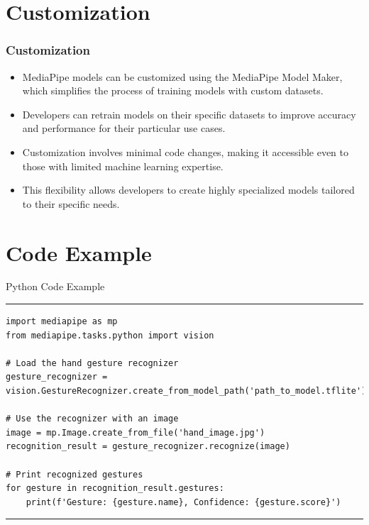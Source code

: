 \documentclass[aspectratio=169, hideothersubsections]{beamer}
\begin{document}
\section{Customization}
\begin{frame}
    \frametitle{Customization}
    \begin{itemize}
        \item MediaPipe models can be customized using the MediaPipe Model Maker, which simplifies the process of training models with custom datasets.
        \item Developers can retrain models on their specific datasets to improve accuracy and performance for their particular use cases.
        \item Customization involves minimal code changes, making it accessible even to those with limited machine learning expertise.
        \item This flexibility allows developers to create highly specialized models tailored to their specific needs.
    \end{itemize}
\end{frame}

\section{Code Example}
\begin{frame}[fragile]{Python Code Example}
\rule{\textwidth}{1pt}
\scriptsize
\begin{verbatim}
import mediapipe as mp
from mediapipe.tasks.python import vision

# Load the hand gesture recognizer
gesture_recognizer = vision.GestureRecognizer.create_from_model_path('path_to_model.tflite')

# Use the recognizer with an image
image = mp.Image.create_from_file('hand_image.jpg')
recognition_result = gesture_recognizer.recognize(image)

# Print recognized gestures
for gesture in recognition_result.gestures:
    print(f'Gesture: {gesture.name}, Confidence: {gesture.score}')
\end{verbatim}
\rule{\textwidth}{1pt}
\end{frame}
\end{document}
